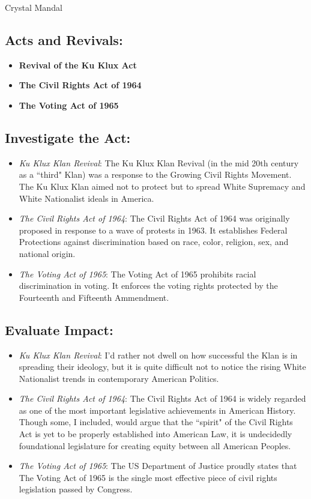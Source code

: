 \documentclass{article}
\begin{document}
Crystal Mandal

\subsection*{Acts and Revivals:}
\begin{itemize}
  \item \textbf{Revival of the Ku Klux Act}
  \item \textbf{The Civil Rights Act of 1964}
  \item \textbf{The Voting Act of 1965}
\end{itemize}

\subsection*{Investigate the Act:}

  \begin{itemize}
    \item \textit{Ku Klux Klan Revival}: The Ku Klux Klan Revival (in the mid 20th
    century as a ``third" Klan) was a response to the Growing Civil Rights Movement. 
    The Ku Klux Klan aimed not to protect but to spread White Supremacy and White 
    Nationalist ideals in America.
    \item \textit{The Civil Rights Act of 1964}: The Civil Rights Act of 1964 was 
    originally proposed in response to a wave of protests in 1963. It establishes 
    Federal Protections against discrimination based on race, color, religion, sex, 
    and national origin. 
    \item \textit{The Voting Act of 1965}: The Voting Act of 1965 prohibits racial 
    discrimination in voting. It enforces the voting rights protected by the Fourteenth 
    and Fifteenth Ammendment.  
  \end{itemize}

\subsection*{Evaluate Impact:}

  \begin{itemize}
    \item \textit{Ku Klux Klan Revival}: I'd rather not dwell on how successful the 
    Klan is in spreading their ideology, but it is quite difficult not to notice the 
    rising White Nationalist trends in contemporary American Politics.
    \item \textit{The Civil Rights Act of 1964}: The Civil Rights Act of 1964 is 
    widely regarded as one of the most important legislative achievements in American 
    History. Though some, I included, would argue that the ``spirit" of the Civil 
    Rights Act is yet to be properly established into American Law, it is undecidedly 
    foundational legislature for creating equity between all American Peoples.
    \item \textit{The Voting Act of 1965}: The US Department of Justice proudly states 
    that The Voting Act of 1965 is the single most effective piece of civil rights 
    legislation passed by Congress.
  \end{itemize}
\end{document}
